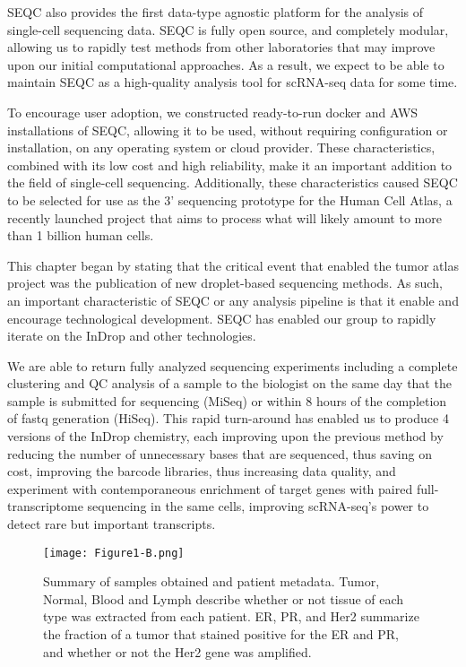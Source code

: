 SEQC also provides the first data-type agnostic platform for the analysis of single-cell sequencing data.
SEQC is fully open source, and completely modular, allowing us to rapidly test methods from other laboratories that may improve upon our initial computational approaches. 
As a result, we expect to be able to maintain SEQC as a high-quality analysis tool for scRNA-seq data for some time. 

To encourage user adoption, we constructed ready-to-run docker and AWS installations of SEQC, allowing it to be used, without requiring configuration or installation, on any operating system or cloud provider. 
These characteristics, combined with its low cost and high reliability, make it an important addition to the field of single-cell sequencing. 
Additionally, these characteristics caused SEQC to be selected for use as the 3' sequencing prototype for the Human Cell Atlas, a recently launched project that aims to process what will likely amount to more than 1 billion human cells.   

This chapter began by stating that the critical event that enabled the tumor atlas project was the publication of new droplet-based sequencing methods. 
As such, an important characteristic of SEQC or any analysis pipeline is that it enable and encourage technological development. 
SEQC has enabled our group to rapidly iterate on the InDrop and other technologies. 

We are able to return fully analyzed sequencing experiments including a complete clustering and QC analysis of a sample to the biologist on the same day that the sample is submitted for sequencing (MiSeq) or within 8 hours of the completion of fastq generation (HiSeq). 
This rapid turn-around has enabled us to produce 4 versions of the InDrop chemistry, each improving upon the previous method by reducing the number of unnecessary bases that are sequenced, thus saving on cost, improving the barcode libraries, thus increasing data quality, and experiment with contemporaneous enrichment of target genes with paired full-transcriptome sequencing in the same cells, improving scRNA-seq's power to detect rare but important transcripts. 

\begin{figure}
\centering
\texttt{[image: Figure1-B.png]}
\caption{Summary of samples obtained and patient metadata. Tumor, Normal, Blood and Lymph describe whether or not tissue of each type was extracted from each patient. ER, PR, and Her2 summarize the fraction of a tumor that stained positive for the ER and PR, and whether or not the Her2 gene was amplified.} 
\label{fig:1b}
\end{figure} 

